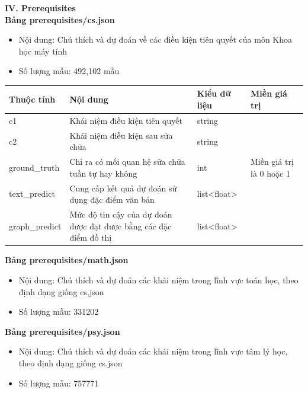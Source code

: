 \textbf{IV. Prerequisites}\\
\textbf{Bảng prerequisites/cs.json}\\
\begin{itemize}
    \item Nội dung: Chú thích và dự đoán về các điều kiện tiên quyết của môn Khoa học máy tính
    \item Số lượng mẫu: 492,102 mẫu
\end{itemize}
\begin{center}
\begin{tabular}{|| m{6em}  m{12em}  m{6em}  m{6em}||} 
 \hline
 \textbf{Thuộc tính} & \textbf{Nội dung} & \textbf{Kiểu dữ liệu} & \textbf{Miền giá trị} \\ [0.5ex] 
 \hline\hline
c1 &Khái niệm điều kiện tiên quyết & string &\\
 \hline
c2 & Khái niệm điều kiện sau sửa chữa & string & \\
 \hline
ground\_truth &Chỉ ra có mối quan hệ sữa chữa tuần tự hay không & int &Miền giá trị là 0 hoặc 1\\
 \hline
text\_predict & Cung cấp kết quả dự đoán sử dụng đặc điểm văn bản & list<float> & \\
 \hline
graph\_predict &Mức độ tin cậy của dự đoán được đạt được bằng các đặc điểm đồ thị  &list<float> &\\ [1ex] 
 \hline
\end{tabular}
\end{center}
%
\textbf{Bảng prerequisites/math.json}\\
\begin{itemize}
    \item Nội dung: Chú thích và dự đoán các khái niệm trong lĩnh vực toán học, theo định dạng giống cs,json
    \item Số lượng mẫu: 331202
\end{itemize}
\textbf{Bảng prerequisites/psy.json}\\
\begin{itemize}
    \item Nội dung: Chú thích và dự đoán các khái niệm trong lĩnh vực tâm lý học, theo định dạng giống cs.json
    \item Số lượng mẫu: 757771
\end{itemize}
